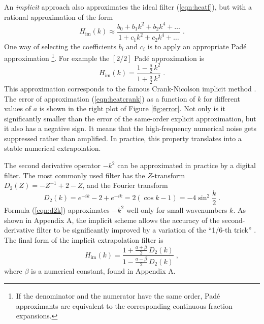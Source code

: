 \par
An \emph{implicit} approach also approximates the ideal filter
(\ref{eqn:heatf}), but with a rational approximation of the form
\begin{equation}
  \label{eqn:heatpade}
  H_{\mbox{im}} (k) \approx \frac{b_0 + b_1 k^2 + b_2 k^4 + \ldots}
  {1 + c_1 k^2 + c_2 k^4 + \ldots}
\;.
\end{equation}
One way of selecting the coefficients $b_i$ and $c_i$ is to apply an
appropriate Pad\'{e} approximation \cite[]{pade}\footnote{If the
  denominator and the numerator have the same order, Pad\'{e}
  approximants are equivalent to the corresponding continuous
  fraction expansions.}.  For example the $[2/2]$ Pad\'{e}
approximation is
\begin{equation}
  \label{eqn:heatcrank}
  H_{\mbox{im}} (k) =
  \frac{1 - \frac{a}{2}\,k^2}{1 + \frac{a}{2}\,k^2}
  \;.
\end{equation}
This approximation corresponds to the famous Crank-Nicolson implicit
method \cite[]{cn}. The error of approximation (\ref{eqn:heatcrank}) as
a function of $k$ for different values of $a$ is shown in the right
plot of Figure \ref{fig:error}. Not only is it significantly smaller
than the error of the same-order explicit approximation, but it also
has a negative sign. It means that the high-frequency numerical noise
gets suppressed rather than amplified. In practice, this property
translates into a stable numerical extrapolation.
\par
The second derivative operator $-k^2$ can be approximated in practice
by a digital filter. The most commonly used filter has the
$Z$-transform $D_2 (Z) = -Z^{-1} + 2 - Z$, and the Fourier transform
\begin{equation}
  \label{eqn:d2k}
  D_2 (k) = e^{-ik} - 2 + e^{-ik} = 2 (\cos{k} - 1) = -4
  \sin^2{\frac{k}{2}}\;.
\end{equation}
Formula (\ref{eqn:d2k}) approximates $-k^2$ well only for small
wavenumbers $k$. As shown in Appendix A, the implicit scheme allows
the accuracy of the second-derivative filter to be significantly
improved by a variation of the ``1/6-th trick''
\cite[]{Claerbout.blackwell.85}. The final form of the implicit
extrapolation filter is
\begin{equation}
  \label{eqn:heatfk}
   H_{\mbox{im}} (k) =
   \frac{1 + \frac{a+\beta}{2}\,D_2 (k)}{1 - \frac{a-\beta}{2}\,D_2 (k)}
   \;,
\end{equation}
where $\beta$ is a numerical constant, found in Appendix A.

